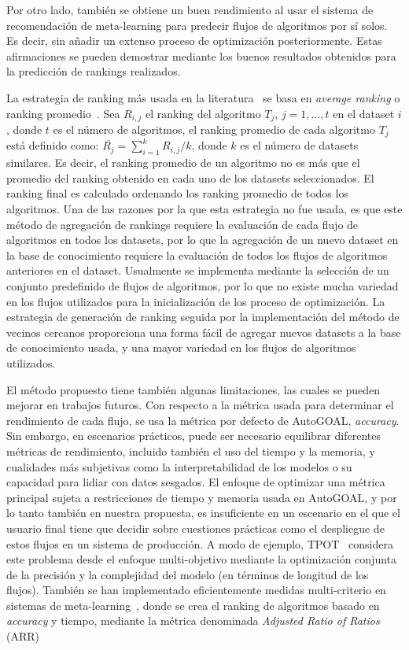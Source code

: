 Por otro lado, también se obtiene un buen rendimiento al usar el sistema de recomendación de meta-learning para predecir flujos de algoritmos por sí solos. Es decir, sin añadir un extenso proceso de optimización posteriormente. Estas afirmaciones se pueden demostrar mediante los buenos resultados obtenidos para la predicción de rankings realizados.

La estrategia de ranking más usada en la literatura~\cite{fuerer2015efficient, sun2014MetaLearningAT, bradzil2009metalearning} se basa en \textit{average ranking} o ranking promedio~\cite{bradzil2009metalearning}. Sea $R_{i,j}$ el ranking del algoritmo $T_{j}$, $j=1,...,t$ en el dataset $i$, donde $t$ es el número de algoritmos, el ranking promedio de cada algoritmo $T_{j}$ está definido como: $\overline{R_{j}} = \sum^{k}_{i=1}R_{i,j} / k$, donde $k$ es el número de datasets similares. Es decir, el ranking promedio de un algoritmo no es más que el promedio del ranking obtenido en cada uno de los datasets seleccionados. El ranking final es calculado ordenando los ranking promedio de todos los algoritmos. Una de las razones por la que esta estrategia no fue usada, es que este método de agregación de rankings requiere la evaluación de cada flujo de algoritmos en todos los datasets, por lo que la agregación de un nuevo dataset en la base de conocimiento requiere la evaluación de todos los flujos de algoritmos anteriores en el dataset. Usualmente se implementa mediante la selección de un conjunto predefinido de flujos de algoritmos, por lo que no existe mucha variedad en los flujos utilizados para la inicialización de los proceso de optimización. La estrategia de generación de ranking seguida por la implementación del método de vecinos cercanos proporciona una forma fácil de agregar nuevos datasets a la base de conocimiento usada, y una mayor variedad en los flujos de algoritmos utilizados.

El método propuesto tiene también algunas limitaciones, las cuales se pueden mejorar en trabajos futuros. Con respecto a la métrica usada para determinar el rendimiento de cada flujo, se usa la métrica por defecto de AutoGOAL, \textit{accuracy}. Sin embargo, en escenarios prácticos, puede ser necesario equilibrar diferentes métricas de rendimiento, incluido también el uso del tiempo y la memoria, y cualidades más subjetivas como la interpretabilidad de los modelos o su capacidad para lidiar con datos sesgados. El enfoque de optimizar una métrica principal sujeta a restricciones de tiempo y memoria usada en AutoGOAL, y por lo tanto también en nuestra propuesta, es insuficiente en un escenario en el que el usuario final tiene que decidir sobre cuestiones prácticas como el despliegue de estos flujos en un sistema de producción. A modo de ejemplo, TPOT~\cite{olson2019tpot} considera este problema desde el enfoque multi-objetivo mediante la optimización conjunta de la precisión y la complejidad del modelo (en términos de longitud de los flujos). También se han implementado eficientemente medidas multi-criterio en sistemas de meta-learning~\cite{bradzil2003ranking}, donde se crea el ranking de algoritmos basado en \textit{accuracy} y tiempo, mediante la métrica denominada \textit{Adjusted Ratio of Ratios} (ARR)~\cite{soares2000measures}

